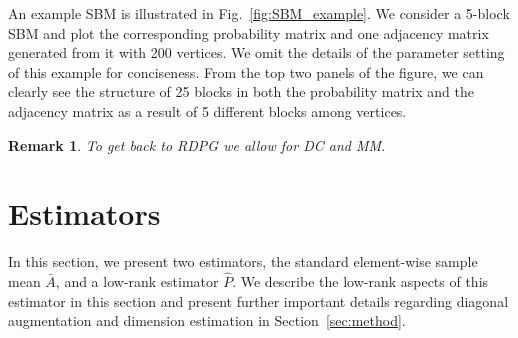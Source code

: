 \documentclass[10pt,letterpaper]{article}
\newtheorem{remark}[fact]{Remark}
\renewcommand{\hat}{\widehat}
\begin{document}
An example SBM is illustrated in Fig.~\ref{fig:SBM_example}.
We consider a 5-block SBM and plot the corresponding probability matrix and one adjacency matrix generated from it with 200 vertices. We omit the details of the parameter setting of this example for conciseness. From the top two panels of the figure, we can clearly see the structure of 25 blocks in both the probability matrix and the adjacency matrix as a result of 5 different blocks among vertices.

\begin{remark}
To get back to RDPG we allow for DC and MM.
\end{remark}


\section{Estimators}
\label{sec:estimator}

In this section, we present two estimators, the standard element-wise sample mean $\bar{A}$, and a low-rank estimator $\hat{P}$.
We describe the low-rank aspects of this estimator in this section and present further important details regarding diagonal augmentation and dimension estimation in Section~\ref{sec:method}.
\end{document}
